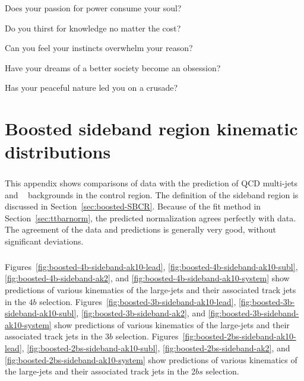 \begin{savequote}[75mm]
Does your passion for power consume your soul?

Do you thirst for knowledge no matter the cost?

Can you feel your instincts overwhelm your reason? 

Have your dreams of a better society become an obsession?

Has your peaceful nature led you on a crusade? 
\end{savequote}
\chapter{Boosted sideband region kinematic distributions}
\label{AppendixSB}

\paragraph{}
This appendix shows comparisons of data with the prediction of QCD multi-jets and \ttbar~ backgrounds in the control region.  
The definition of the sideband region is discussed in Section~\ref{sec:boosted-SBCR}.
Because of the fit method in Section~\ref{sec:ttbarnorm}, the predicted normalization agrees perfectly with data.
The agreement of the data and predictions is generally very good, without significant deviations.

\paragraph{}
Figures~\ref{fig:boosted-4b-sideband-ak10-lead}, \ref{fig:boosted-4b-sideband-ak10-subl}, \ref{fig:boosted-4b-sideband-ak2},  and \ref{fig:boosted-4b-sideband-ak10-system} show predictions of various kinematics of the large-\R jets and their associated track jets in the $4b$ selection.
Figures~\ref{fig:boosted-3b-sideband-ak10-lead}, \ref{fig:boosted-3b-sideband-ak10-subl}, \ref{fig:boosted-3b-sideband-ak2},  and \ref{fig:boosted-3b-sideband-ak10-system} show predictions of various kinematics of the large-\R jets and their associated track jets in the $3b$ selection.
Figures~\ref{fig:boosted-2bs-sideband-ak10-lead}, \ref{fig:boosted-2bs-sideband-ak10-subl}, \ref{fig:boosted-2bs-sideband-ak2},  and \ref{fig:boosted-2bs-sideband-ak10-system} show predictions of various kinematics of the large-\R jets and their associated track jets in the 2$bs$ selection.


